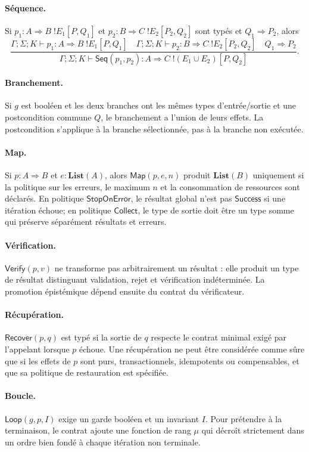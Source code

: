 \documentclass[11pt,a4paper]{article}
\theoremstyle{definition}
\theoremstyle{plain}
\theoremstyle{remark}
\begin{document}
\paragraph{Séquence.} Si $p_1:A\Rightarrow B\;!E_1[P,Q_1]$ et $p_2:B\Rightarrow C\;!E_2[P_2,Q_2]$ sont typés et $Q_1\Rightarrow P_2$, alors
\[
\frac{\Gamma;\Sigma;K\vdash p_1:A\Rightarrow B\;!E_1[P,Q_1]\quad
\Gamma;\Sigma;K\vdash p_2:B\Rightarrow C\;!E_2[P_2,Q_2]\quad Q_1\Rightarrow P_2}
{\Gamma;\Sigma;K\vdash \mathsf{Seq}(p_1,p_2):A\Rightarrow C\;!(E_1\cup E_2)[P,Q_2]}.
\]
\paragraph{Branchement.} Si $g$ est booléen et les deux branches ont les mêmes types d'entrée/sortie et une postcondition commune $Q$, le branchement a l'union de leurs effets. La postcondition s'applique à la branche sélectionnée, pas à la branche non exécutée.
\paragraph{Map.} Si $p:A\Rightarrow B$ et $e:\mathbf{List}(A)$, alors $\mathsf{Map}(p,e,n)$ produit $\mathbf{List}(B)$ uniquement si la politique sur les erreurs, le maximum $n$ et la consommation de ressources sont déclarés. En politique $\mathsf{StopOnError}$, le résultat global n'est pas $\mathsf{Success}$ si une itération échoue; en politique $\mathsf{Collect}$, le type de sortie doit être un type somme qui préserve séparément résultats et erreurs.
\paragraph{Vérification.} $\mathsf{Verify}(p,v)$ ne transforme pas arbitrairement un résultat : elle produit un type de résultat distinguant validation, rejet et vérification indéterminée. La promotion épistémique dépend ensuite du contrat du vérificateur.
\paragraph{Récupération.} $\mathsf{Recover}(p,q)$ est typé si la sortie de $q$ respecte le contrat minimal exigé par l'appelant lorsque $p$ échoue. Une récupération ne peut être considérée comme sûre que si les effets de $p$ sont purs, transactionnels, idempotents ou compensables, et que sa politique de restauration est spécifiée.
\paragraph{Boucle.} $\mathsf{Loop}(g,p,I)$ exige un garde booléen et un invariant $I$. Pour prétendre à la terminaison, le contrat ajoute une fonction de rang $\mu$ qui décroît strictement dans un ordre bien fondé à chaque itération non terminale.
\end{document}
